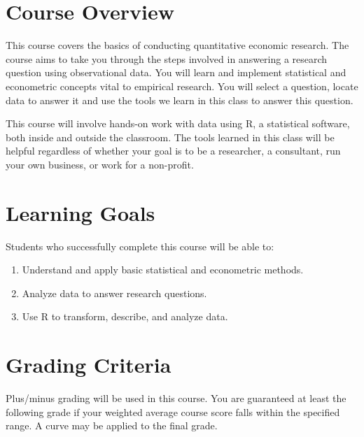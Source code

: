\documentclass{syllabus}
\begin{document}
\section*{Course Overview}
This course covers the basics of conducting quantitative economic research. The course aims to take you through the steps involved in answering a research question using observational data. You will learn and implement statistical and econometric concepts vital to empirical research. You will select a question, locate data to answer it and use the tools we learn in this class to answer this question.

This course will involve hands-on work with data using $\mathrm{R}$, a statistical software, both inside and outside the classroom. The tools learned in this class will be helpful regardless of whether your goal is to be a researcher, a consultant, run your own business, or work for a non-profit.

\section*{Learning Goals}
Students who successfully complete this course will be able to:
\begin{enumerate}
\itemsep0em 
  \item Understand and apply basic statistical and econometric methods.
  \item Analyze data to answer research questions.
  \item Use $\mathrm{R}$ to transform, describe, and analyze data.
\end{enumerate}

\section*{Grading Criteria}

Plus/minus grading will be used in this course. You are guaranteed at least the following grade if your weighted average course score falls within the specified range. A curve may be applied to the final grade.
\end{document}
